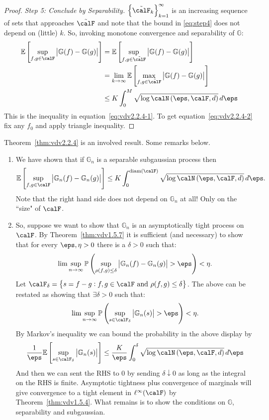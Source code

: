 \begin{proof}
	\emph{Step 5: Conclude by Separability.} \(\left\{\tilde\calF_k\right\}_{k=1}^\infty\) is an increasing sequence of sets that approaches \(\tilde\calF\) and note that the bound in \eqref{eq:step4} does not depend on (little) \(k\). So, invoking monotone convergence and separability of \(\mathbb{G}\):
	\begin{align*}
		\E\left[\sup_{f,g\in\calF}\left|\mathbb{G}(f)-\mathbb{G}(g)\right|\right]
		&= \E\left[\sup_{f,g\in\tilde\calF}\left|\mathbb{G}(f)-\mathbb{G}(g)\right|\right] \\
		&= \lim_{k\to\infty}\E\left[\max_{f,g\in\tilde\calF}\left|\mathbb{G}(f)-\mathbb{G}(g)\right|\right] \\
		&\leq K \int_{0}^{M} \sqrt{\log\calN\left(\eps,\calF,d\right)}\,d\eps 
	\end{align*}
	This is the inequality in equation~\eqref{eq:vdv2.2.4-1}. To get equation~\eqref{eq:vdv2.2.4-2} fix any \(f_0\) and apply triangle inequality.
\end{proof}

\begin{remark*}
    Theorem~\ref{thm:vdv2.2.4} is an involved result. Some remarks below.
	\begin{enumerate}
		\item We have shown that if \(\mathbb{G}_n\) is a separable subgaussian process then
			\[
				\E\left[\sup_{f,g\in\calF}\left|\mathbb{G}_n(f)-\mathbb{G}_n(g)\right|\right] \leq  K \int_{0}^{\text{diam}(\calF)}\sqrt{\log\calN\left(\eps,\calF,d\right)}\,d\eps 
			.\]
		Note that the right hand side does not depend on \(\mathbb{G}_n\) at all! Only on the ``size" of \(\calF\).
		\item So, suppose we want to show that \(\mathbb{G}_n\) is an asymptotically tight process on \(\calF\). By Theorem~\ref{thm:vdv1.5.7} it is sufficient (and necessary) to show that for every \(\eps,\eta >0\) there is a  \(\delta > 0\) such that: 
			\[
				\lim\sup_{n\to\infty}\P\left(\sup_{\rho(f,g)\leq \delta}\left|\mathbb{G}_n(f)-\mathbb{G}_n(g)\right|>\eps\right)<\eta
			.\] 
			Let \(\calF_\delta = \left\{s=f-g:f,g\in\calF\text{ and }\rho(f,g)\leq \delta\right\}\). The above can be restated as showing that \(\exists\delta>0\) such that:
			\[
				\lim\sup_{n\to\infty}\P\left(\sup_{s\in\calF_\delta}\left|\mathbb{G}_n(s)\right|>\eps\right)<\eta
			.\] 
			By Markov's inequality we can bound the probability in the above display by 
			\[		\frac{1}{\eps}\E\left[\sup_{s\in\calF_\delta}\left|\mathbb{G}_n(s)\right|\right] \leq  \frac{K}{\eps} \int_{0}^{\delta}\sqrt{\log\calN\left(\eps,\calF,d\right)}\,d\eps  
			\]
			And then we can sent the RHS to 0 by sending \(\delta\downarrow 0\) as long as the integral on the RHS is finite. Asymptotic tightness plus convergence of marginals will give convergence to a tight element in \(\ell^\infty(\calF)\) by Theorem~\ref{thm:vdv1.5.4}. What remains is to show the conditions on \(\mathbb{G}\), separability and subgaussian.
	\end{enumerate}	
\end{remark*}
